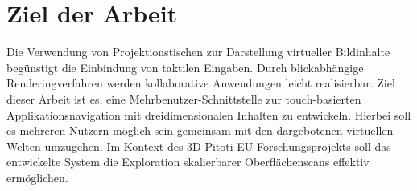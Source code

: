 \section{Ziel der Arbeit}
\label{sec:ziel_der_arbeit}

Die Verwendung von Projektionstischen zur Darstellung virtueller Bildinhalte begünstigt die Einbindung von taktilen Eingaben. Durch blickabhängige Renderingverfahren werden kollaborative Anwendungen leicht realisierbar. Ziel dieser Arbeit ist es, eine Mehrbenutzer-Schnittstelle zur touch-basierten Applikationsnavigation mit dreidimensionalen Inhalten zu entwickeln. Hierbei soll es mehreren Nutzern möglich sein gemeinsam mit den dargebotenen virtuellen Welten umzugehen. Im Kontext des 3D Pitoti EU Forschungsprojekts soll das entwickelte System die Exploration skalierbarer Oberflächenscans effektiv ermöglichen.
\\\\
